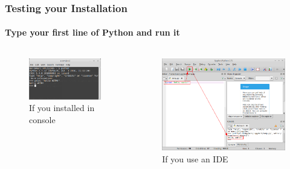 \documentclass{beamer}
\begin{document}
	\begin{frame}
	\frametitle{Testing your Installation}
	\framesubtitle{Type your first line of Python and run it}
	\begin{columns}
	        \begin{figure}[h]
                \centering
                \includegraphics[width=\textwidth]{./images/console-screenshot}
                \caption[font=tiny]{If you installed in console}
        	\end{figure}
	        \begin{figure}[h]
                \centering
                \includegraphics[width=\textwidth]{./images/spyder-screenshot-commented}
                \caption[font=tiny]{If you use an IDE}
        	\end{figure}
	\end{columns}
	\end{frame}
\end{document}
